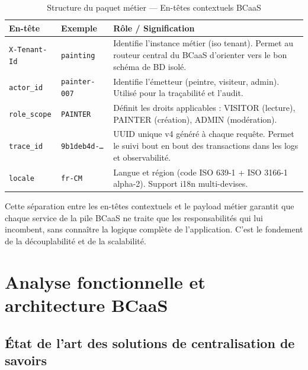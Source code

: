 \documentclass[12pt,a4paper]{report}
\begin{document}
\begin{table}[H]
\centering
\caption{Structure du paquet métier --- En-têtes contextuels BCaaS}
\label{tab:metadata_headers}
\small
\begin{tabular}{|p{}|p{}|p{}|}
\hline
\textbf{En-tête} & \textbf{Exemple} & \textbf{Rôle / Signification} \\
\hline
\texttt{X-Tenant-Id} & \texttt{painting} & Identifie l'instance métier (iso tenant). Permet au routeur central du BCaaS d'orienter vers le bon schéma de BD isolé. \\
\hline
\texttt{actor\_id} & \texttt{painter-007} & Identifie l'émetteur (peintre, visiteur, admin). Utilisé pour la traçabilité et l'audit. \\
\hline
\texttt{role\_scope} & \texttt{PAINTER} & Définit les droits applicables : VISITOR (lecture), PAINTER (création), ADMIN (modération). \\
\hline
\texttt{trace\_id} & \texttt{9b1deb4d-\ldots} & UUID unique v4 généré à chaque requête. Permet le suivi bout en bout des transactions dans les logs et observabilité. \\
\hline
\texttt{locale} & \texttt{fr-CM} & Langue et région (code ISO 639-1 + ISO 3166-1 alpha-2). Support i18n multi-devises. \\
\hline
\end{tabular}
\end{table}

Cette séparation entre les en-têtes contextuels et le payload métier garantit que chaque service de la pile BCaaS ne traite que les responsabilités qui lui incombent, sans connaître la logique complète de l'application. C'est le fondement de la découplabilité et de la scalabilité.

\newpage

\section{Analyse fonctionnelle et architecture BCaaS}


\subsection{État de l'art des solutions de centralisation de savoirs}
\end{document}
